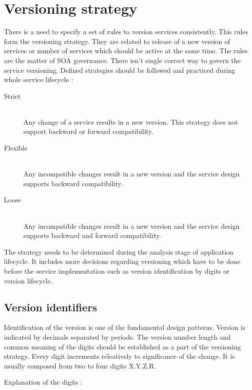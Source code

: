 \section{Versioning strategy}
\label{sec:version-strategy}
There is a need to specify a set of rules to version services consistently. This rules form the versioning strategy. They are related to release of a new version of services or number of services which should be active at the same time. The rules are the matter of SOA governance. There isn't single correct way to govern the service versioning. Defined strategies should be followed and practiced during whole service lifecycle \cite{soa-governance}:

\begin{description}
  \item[Strict]  \hfill \\
  Any change of a service results in a new version. This strategy does not support backward or forward compatibility.
  \item[Flexible] \hfill \\
  Any incompatible changes result in a new version and the service design supports backward compatibility.
  \item[Loose] \hfill \\
  Any incompatible changes result in a new version and the service design supports backward and forward compatibility.
\end{description}

The strategy needs to be determined during the analysis stage of application lifecycle. It includes more decisions regarding versioning which have to be done before the service implementation such as version identification by digits or version lifecycle.

\subsection{Version identifiers}
\label{subsec:versionid}
Identification of the version is one of the fundamental design patterns. Version is indicated by decimals separated by periods. The version number length and common meaning of the digits should be established as a part of the versioning strategy. Every digit increments releatively to significance of the change. It is usually composed from two to four digits X.Y.Z.R.

Explanation of the digits \cite{soa-governance}:

